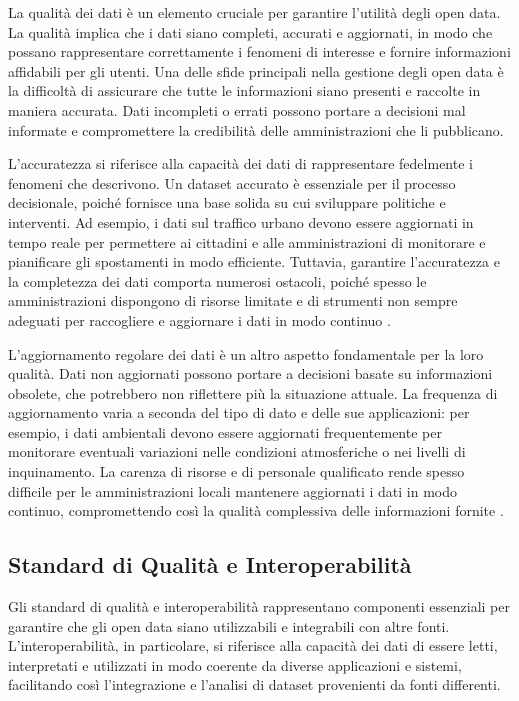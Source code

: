 La qualità dei dati è un elemento cruciale per garantire l'utilità degli open data. La qualità implica che i dati siano completi, accurati e aggiornati, in modo che possano rappresentare correttamente i fenomeni di interesse e fornire informazioni affidabili per gli utenti. Una delle sfide principali nella gestione degli open data è la difficoltà di assicurare che tutte le informazioni siano presenti e raccolte in maniera accurata. Dati incompleti o errati possono portare a decisioni mal informate e compromettere la credibilità delle amministrazioni che li pubblicano.

L’accuratezza si riferisce alla capacità dei dati di rappresentare fedelmente i fenomeni che descrivono. Un dataset accurato è essenziale per il processo decisionale, poiché fornisce una base solida su cui sviluppare politiche e interventi. Ad esempio, i dati sul traffico urbano devono essere aggiornati in tempo reale per permettere ai cittadini e alle amministrazioni di monitorare e pianificare gli spostamenti in modo efficiente. Tuttavia, garantire l’accuratezza e la completezza dei dati comporta numerosi ostacoli, poiché spesso le amministrazioni dispongono di risorse limitate e di strumenti non sempre adeguati per raccogliere e aggiornare i dati in modo continuo \cite{Janssen2012}.

L’aggiornamento regolare dei dati è un altro aspetto fondamentale per la loro qualità. Dati non aggiornati possono portare a decisioni basate su informazioni obsolete, che potrebbero non riflettere più la situazione attuale. La frequenza di aggiornamento varia a seconda del tipo di dato e delle sue applicazioni: per esempio, i dati ambientali devono essere aggiornati frequentemente per monitorare eventuali variazioni nelle condizioni atmosferiche o nei livelli di inquinamento. La carenza di risorse e di personale qualificato rende spesso difficile per le amministrazioni locali mantenere aggiornati i dati in modo continuo, compromettendo così la qualità complessiva delle informazioni fornite \cite{Kitchin2014}.

\subsection{Standard di Qualità e Interoperabilità}

Gli standard di qualità e interoperabilità rappresentano componenti essenziali per garantire che gli open data siano utilizzabili e integrabili con altre fonti. L’interoperabilità, in particolare, si riferisce alla capacità dei dati di essere letti, interpretati e utilizzati in modo coerente da diverse applicazioni e sistemi, facilitando così l'integrazione e l'analisi di dataset provenienti da fonti differenti.

